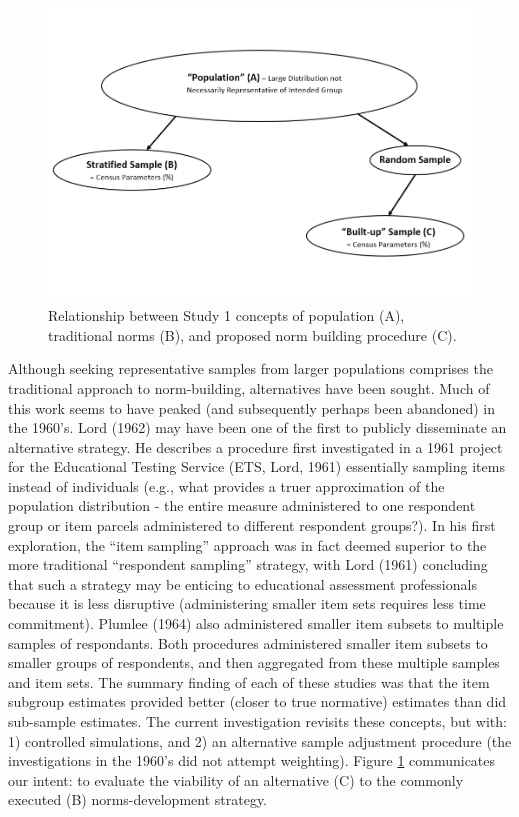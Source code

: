 \documentclass[
  ,man]{apa7}
\begin{document}
\begin{figure}
\centering
\includegraphics{NormsBuilding_files/figure-latex/schematic-1.pdf}
\caption{\label{fig:schematic}Relationship between Study 1 concepts of population (A), traditional norms (B), and proposed norm building procedure (C).}
\end{figure}

Although seeking representative samples from larger populations comprises the traditional approach to norm-building, alternatives have been sought. Much of this work seems to have peaked (and subsequently perhaps been abandoned) in the 1960's. Lord (1962) may have been one of the first to publicly disseminate an alternative strategy. He describes a procedure first investigated in a 1961 project for the Educational Testing Service (ETS, Lord, 1961) essentially sampling items instead of individuals (e.g., what provides a truer approximation of the population distribution - the entire measure administered to one respondent group or item parcels administered to different respondent groups?). In his first exploration, the ``item sampling'' approach was in fact deemed superior to the more traditional ``respondent sampling'' strategy, with Lord (1961) concluding that such a strategy may be enticing to educational assessment professionals because it is less disruptive (administering smaller item sets requires less time commitment). Plumlee (1964) also administered smaller item subsets to multiple samples of respondants. Both procedures administered smaller item subsets to smaller groups of respondents, and then aggregated from these multiple samples and item sets. The summary finding of each of these studies was that the item subgroup estimates provided better (closer to true normative) estimates than did sub-sample estimates. The current investigation revisits these concepts, but with: 1) controlled simulations, and 2) an alternative sample adjustment procedure (the investigations in the 1960's did not attempt weighting). Figure \ref{fig:schematic} communicates our intent: to evaluate the viability of an alternative (C) to the commonly executed (B) norms-development strategy.
\end{document}
